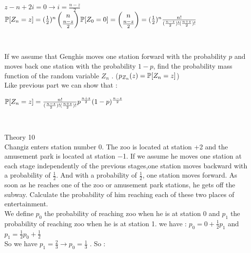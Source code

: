 \documentclass[30pt]{article}
\begin{document}
\begin{center}
    $z - n + 2i = 0 \rightarrow i = \frac{n-z}{2} $ \vspace{0.2cm} \\ 
    $\Bbb{P}[Z_{n} = z] = (\frac{1}{2})^n \begin{pmatrix} n \\ \frac{n-z}{2} \end{pmatrix} \Bbb{P}[Z_{0} = 0] = \begin{pmatrix} n \\ \frac{n-z}{2} \end{pmatrix} = (\frac{1}{2})^n \frac{n!}{(\frac{n-z}{2})!(\frac{n+z}{2})!} $
\end{center} \\ \newline

{\color{blue}{\large 3.} If we assume that Genghis moves one station forward with the probability $p$ and moves back one station with the probability  $1-p$, find the probability mass function of the random variable $Z_n$ . ($p_{Z_{n}}(z) = \Bbb{P}[Z_{n} = z]$)} \\ \newline 
Like previous part we can show that : \\ 
\begin{center}
    $\Bbb{P}[Z_{n} = z] = \frac{n!}{(\frac{n-z}{2})!(\frac{n+z}{2})!} p^{\frac{n+z}{2}} (1-p)^{\frac{n-z}{2}} $
\end{center} \\ \newline

{\Large \color{blue} Theory 10 } \\
{\color{blue} Changiz enters station number 0. The zoo is located at station +2 and the amusement park is located at station −1. If we assume he moves one station at each stage independently of the previous stages,one station moves backward with a probability of $\frac{1}{2}$. And with a probability of $\frac{1}{2}$, one station moves forward. As soon as he reaches one of the zoo or amusement park stations, he gets off the subway. Calculate the probability of him reaching each of these two places of entertainment. } \\ \newline 
We define $p_0 $ the probability of reaching zoo when he is at station 0 and $p_1 $ the probability of reaching zoo when he is at station 1. we have : \hspace{0.1cm} $p_0 = 0 + \frac{1}{2}p_1 $  \hspace{0.1cm} and \hspace{0.1cm}  $p_1 = \frac{1}{2}p_0 + \frac{1}{2} $ \\
So we have $p_1 = \frac{2}{3} \rightarrow p_0 = \frac{1}{3} $ . So : \\
\end{document}
